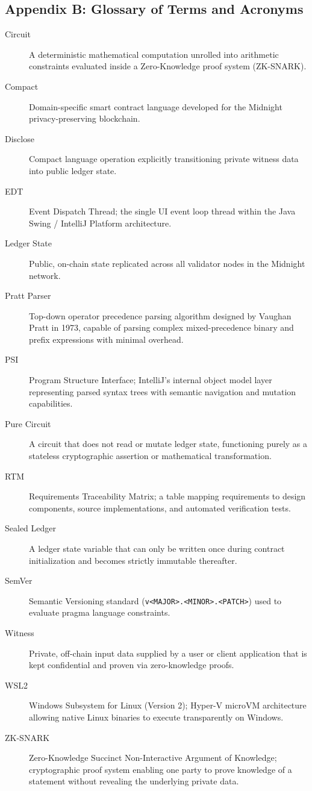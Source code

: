 \subsection{Appendix B: Glossary of Terms and Acronyms}
\label{sec:appendix_glossary}

\begin{description}
    \item[Circuit] A deterministic mathematical computation unrolled into arithmetic constraints evaluated inside a Zero-Knowledge proof system (ZK-SNARK).
    \item[Compact] Domain-specific smart contract language developed for the Midnight privacy-preserving blockchain.
    \item[Disclose] Compact language operation explicitly transitioning private witness data into public ledger state.
    \item[EDT] Event Dispatch Thread; the single UI event loop thread within the Java Swing / IntelliJ Platform architecture.
    \item[Ledger State] Public, on-chain state replicated across all validator nodes in the Midnight network.
    \item[Pratt Parser] Top-down operator precedence parsing algorithm designed by Vaughan Pratt in 1973, capable of parsing complex mixed-precedence binary and prefix expressions with minimal overhead.
    \item[PSI] Program Structure Interface; IntelliJ's internal object model layer representing parsed syntax trees with semantic navigation and mutation capabilities.
    \item[Pure Circuit] A circuit that does not read or mutate ledger state, functioning purely as a stateless cryptographic assertion or mathematical transformation.
    \item[RTM] Requirements Traceability Matrix; a table mapping requirements to design components, source implementations, and automated verification tests.
    \item[Sealed Ledger] A ledger state variable that can only be written once during contract initialization and becomes strictly immutable thereafter.
    \item[SemVer] Semantic Versioning standard (\texttt{v<MAJOR>.<MINOR>.<PATCH>}) used to evaluate pragma language constraints.
    \item[Witness] Private, off-chain input data supplied by a user or client application that is kept confidential and proven via zero-knowledge proofs.
    \item[WSL2] Windows Subsystem for Linux (Version 2); Hyper-V microVM architecture allowing native Linux binaries to execute transparently on Windows.
    \item[ZK-SNARK] Zero-Knowledge Succinct Non-Interactive Argument of Knowledge; cryptographic proof system enabling one party to prove knowledge of a statement without revealing the underlying private data.
\end{description}

